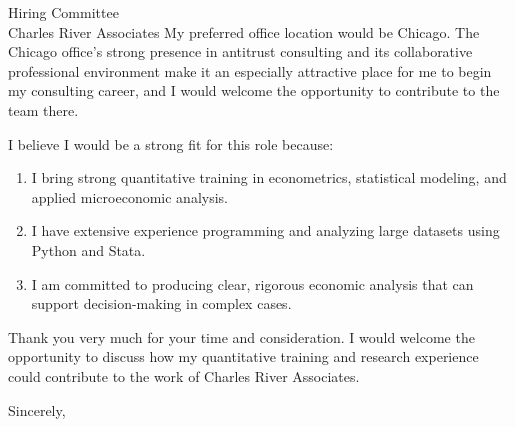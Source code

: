 \documentclass[11pt,letterpaper]{letter}
\begin{document}
\begin{letter}{
Hiring Committee \\
Charles River Associates
}
My preferred office location would be Chicago. The Chicago office’s strong presence in antitrust consulting and its collaborative professional environment make it an especially attractive place for me to begin my consulting career, and I would welcome the opportunity to contribute to the team there.

I believe I would be a strong fit for this role because:
\begin{enumerate}
\item I bring strong quantitative training in econometrics, statistical modeling, and applied microeconomic analysis.
\item I have extensive experience programming and analyzing large datasets using Python and Stata.
\item I am committed to producing clear, rigorous economic analysis that can support decision-making in complex cases.
\end{enumerate}

Thank you very much for your time and consideration. I would welcome the opportunity to discuss how my quantitative training and research experience could contribute to the work of Charles River Associates.

\closing{Sincerely,}

\end{letter}
\end{document}
